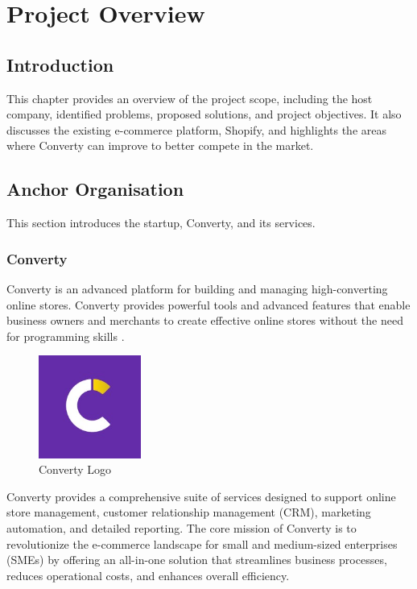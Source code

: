 \chapter{Project Overview}
\setcounter{minitocdepth}{1}
\minitoc
\newpage
\setcounter{secnumdepth}{3}

\section{Introduction}
This chapter provides an overview of the project scope, including the host company, identified problems, proposed solutions, and project objectives. It also discusses the existing e-commerce platform, Shopify, and highlights the areas where Converty can improve to better compete in the market.

\section{Anchor Organisation}
This section introduces the startup, Converty, and its services.
\subsection{Converty}
Converty is an advanced platform for building and managing high-converting online stores. Converty provides powerful tools and advanced features that enable business owners and merchants to create effective online stores without the need for programming skills \cite{convertywebsite}.

\begin{figure}[H]
  \centering
  \includegraphics[width=0.3\textwidth]{Images/convertyLogo.jpeg}
  \caption{Converty Logo}
  \label{fig:Converty Logo}
\end{figure}

Converty provides a comprehensive suite of services designed to support online store management, customer relationship management (CRM), marketing automation, and detailed reporting. The core mission of Converty is to revolutionize the e-commerce landscape for small and medium-sized enterprises (SMEs) by offering an all-in-one solution that streamlines business processes, reduces operational costs, and enhances overall efficiency.
\newline

